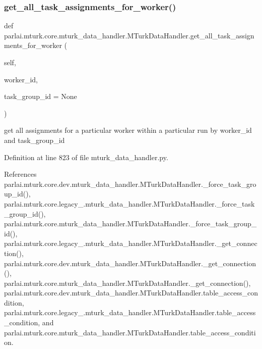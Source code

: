 \subsubsection{\texorpdfstring{get\+\_\+all\+\_\+task\+\_\+assignments\+\_\+for\+\_\+worker()}{get\_all\_task\_assignments\_for\_worker()}}
{\footnotesize\ttfamily def parlai.\+mturk.\+core.\+mturk\+\_\+data\+\_\+handler.\+M\+Turk\+Data\+Handler.\+get\+\_\+all\+\_\+task\+\_\+assignments\+\_\+for\+\_\+worker (\begin{DoxyParamCaption}\item[{}]{self,  }\item[{}]{worker\+\_\+id,  }\item[{}]{task\+\_\+group\+\_\+id = {\ttfamily None} }\end{DoxyParamCaption})}

\begin{DoxyVerb}get all assignments for a particular worker within a
particular run by worker_id and task_group_id
\end{DoxyVerb}
 

Definition at line 823 of file mturk\+\_\+data\+\_\+handler.\+py.



References parlai.\+mturk.\+core.\+dev.\+mturk\+\_\+data\+\_\+handler.\+M\+Turk\+Data\+Handler.\+\_\+force\+\_\+task\+\_\+group\+\_\+id(), parlai.\+mturk.\+core.\+legacy\+\_.\+mturk\+\_\+data\+\_\+handler.\+M\+Turk\+Data\+Handler.\+\_\+force\+\_\+task\+\_\+group\+\_\+id(), parlai.\+mturk.\+core.\+mturk\+\_\+data\+\_\+handler.\+M\+Turk\+Data\+Handler.\+\_\+force\+\_\+task\+\_\+group\+\_\+id(), parlai.\+mturk.\+core.\+legacy\+\_.\+mturk\+\_\+data\+\_\+handler.\+M\+Turk\+Data\+Handler.\+\_\+get\+\_\+connection(), parlai.\+mturk.\+core.\+dev.\+mturk\+\_\+data\+\_\+handler.\+M\+Turk\+Data\+Handler.\+\_\+get\+\_\+connection(), parlai.\+mturk.\+core.\+mturk\+\_\+data\+\_\+handler.\+M\+Turk\+Data\+Handler.\+\_\+get\+\_\+connection(), parlai.\+mturk.\+core.\+dev.\+mturk\+\_\+data\+\_\+handler.\+M\+Turk\+Data\+Handler.\+table\+\_\+access\+\_\+condition, parlai.\+mturk.\+core.\+legacy\+\_.\+mturk\+\_\+data\+\_\+handler.\+M\+Turk\+Data\+Handler.\+table\+\_\+access\+\_\+condition, and parlai.\+mturk.\+core.\+mturk\+\_\+data\+\_\+handler.\+M\+Turk\+Data\+Handler.\+table\+\_\+access\+\_\+condition.

